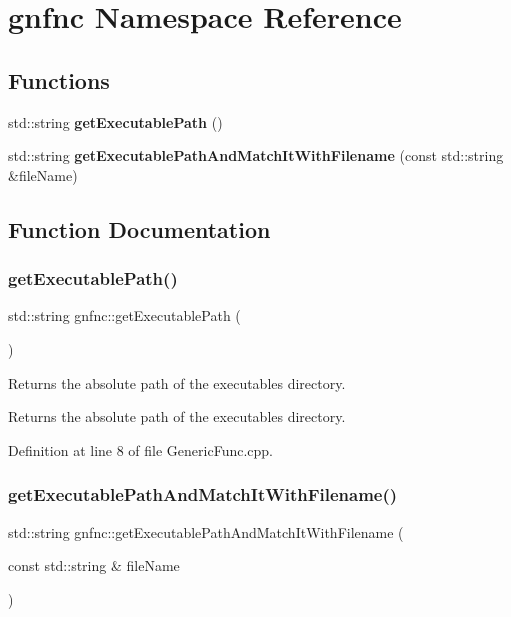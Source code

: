 \section{gnfnc Namespace Reference}
\label{namespacegnfnc}
\subsection*{Functions}
\begin{DoxyCompactItemize}
\item 
std\+::string \textbf{ get\+Executable\+Path} ()
\item 
std\+::string \textbf{ get\+Executable\+Path\+And\+Match\+It\+With\+Filename} (const std\+::string \&file\+Name)
\end{DoxyCompactItemize}


\subsection{Function Documentation}
\mbox{\label{namespacegnfnc_a83d25b352dc66d2317f398c5a3c67f81}} 
\subsubsection{get\+Executable\+Path()}
{\footnotesize\ttfamily std\+::string gnfnc\+::get\+Executable\+Path (\begin{DoxyParamCaption}{ }\end{DoxyParamCaption})}

Returns the absolute path of the executable\textquotesingle{}s directory. \begin{DoxyReturn}{Returns}
the absolute path of the executable\textquotesingle{}s directory. 
\end{DoxyReturn}


Definition at line 8 of file Generic\+Func.\+cpp.

\mbox{\label{namespacegnfnc_adf0284ac1df7768c93180ada79054488}} 
\subsubsection{get\+Executable\+Path\+And\+Match\+It\+With\+Filename()}
{\footnotesize\ttfamily std\+::string gnfnc\+::get\+Executable\+Path\+And\+Match\+It\+With\+Filename (\begin{DoxyParamCaption}\item[{const std\+::string \&}]{file\+Name }\end{DoxyParamCaption})}

